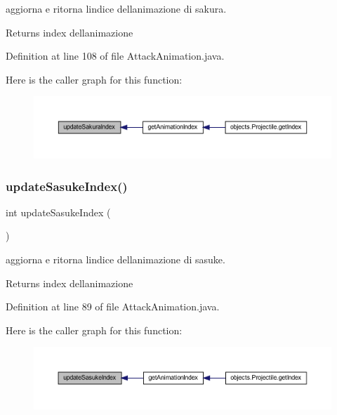 aggiorna e ritorna l\textquotesingle{}indice dell\textquotesingle{}animazione di sakura. 

\begin{DoxyReturn}{Returns}
index dell\textquotesingle{}animazione 
\end{DoxyReturn}


Definition at line 108 of file Attack\+Animation.\+java.

Here is the caller graph for this function\+:\nopagebreak
\begin{figure}[H]
\begin{center}
\leavevmode
\includegraphics[width=350pt]{classtowers_1_1_attack_animation_a1f8c2a2ac98f9746a0175442814aca4b_icgraph}
\end{center}
\end{figure}
\mbox{\label{classtowers_1_1_attack_animation_a6b8b22718154d24a23128663058f8780}} 
\subsubsection{\texorpdfstring{update\+Sasuke\+Index()}{updateSasukeIndex()}}
{\footnotesize\ttfamily int update\+Sasuke\+Index (\begin{DoxyParamCaption}{ }\end{DoxyParamCaption})\hspace{0.3cm}{\ttfamily [private]}}



aggiorna e ritorna l\textquotesingle{}indice dell\textquotesingle{}animazione di sasuke. 

\begin{DoxyReturn}{Returns}
index dell\textquotesingle{}animazione 
\end{DoxyReturn}


Definition at line 89 of file Attack\+Animation.\+java.

Here is the caller graph for this function\+:\nopagebreak
\begin{figure}[H]
\begin{center}
\leavevmode
\includegraphics[width=350pt]{classtowers_1_1_attack_animation_a6b8b22718154d24a23128663058f8780_icgraph}
\end{center}
\end{figure}


